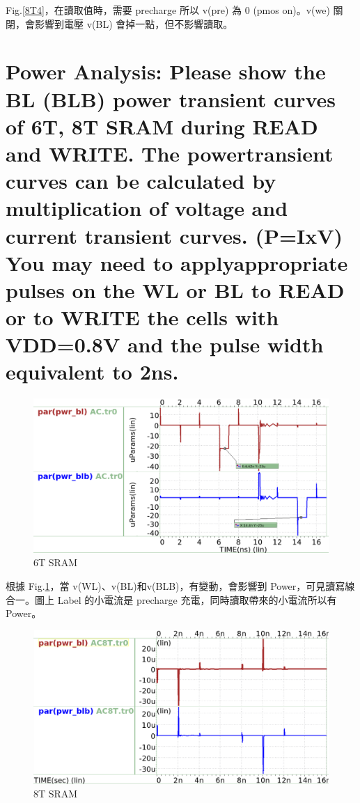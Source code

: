 \documentclass{article}
\begin{document}
Fig.\ref{8T4}，在讀取值時，需要 precharge 所以 v(pre) 為 0 (pmos on)。v(we) 關閉，會影響到電壓 v(BL) 會掉一點，但不影響讀取。

\section{Power Analysis: Please show the BL (BLB) power transient curves of 6T, 8T SRAM during READ and WRITE. The powertransient curves can be calculated by multiplication of voltage and current transient curves. (P=IxV) You may need to applyappropriate pulses on the WL or BL to READ or to WRITE the cells with VDD=0.8V and the pulse width equivalent to 2ns.}

\begin{figure}[H]
\centering
\includegraphics[width=\linewidth]{./img/2023-11-16-09-11-23.png}
\caption{6T SRAM}
\label{p6T}
\end{figure}

根據 Fig.\ref{p6T}，當 v(WL)、v(BL)和v(BLB)，有變動，會影響到 Power，可見讀寫線合一。圖上 Label 的小電流是 precharge 充電，同時讀取帶來的小電流所以有 Power。
   

\begin{figure}[H]
    \centering
    \includegraphics[width=\linewidth]{./img/2023-11-16-13-29-31.png}
    \caption{8T SRAM}
\label{p8T}
    \end{figure}
    
\end{document}
